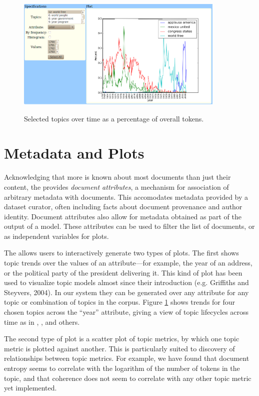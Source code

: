 \documentclass[11pt]{article}
\newcommand{\comments}[1]{}
\begin{document}
\begin{figure}[t]
 \centering
 \includegraphics[height=200px,keepaspectratio=true]{./topics_vs_years.png}
 \label{fig:chart}
 \caption{Selected topics over time as a percentage of overall tokens.}
\end{figure}

\section{Metadata and Plots}\label{sec:plots}
Acknowledging that more is known about most documents than just their content,
the \tool{} provides \textit{document attributes}, a mechanism for association
of arbitrary metadata with documents. This accomodates metadata
provided by a dataset curator, often including facts about document
provenance and author identity. Document attributes also allow for metadata
obtained as part of the output of a model. These attributes can be used to
filter the list of documents, or as independent variables for plots.

The \tool{} allows users to interactively generate two types of plots. The first
shows topic trends over the values of an attribute---for example, the year
of an address, or the political party of the president delivering it. This kind
of plot has been used to visualize topic models almost since their
introduction (e.g. Griffiths and Steyvers, 2004)\comments{\cite{Griffiths2004}}. %
In our system they can be generated over any attribute for any
topic or combination of topics in the corpus. Figure \ref{fig:chart} shows
trends for four chosen topics across the ``year'' attribute, giving a view
of topic lifecycles across time as in , , and others.

The second type of plot is a scatter plot of topic metrics, by which one topic
metric is plotted against another. This is particularly suited to discovery of
relationships between topic metrics. For example, we have found that document
entropy seems to correlate with the logarithm of the number of tokens in the
topic, and that coherence does not seem to correlate with any other topic metric
yet implemented.
\end{document}
